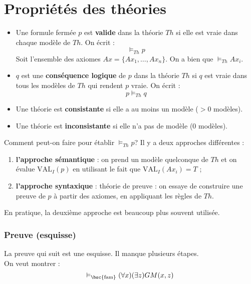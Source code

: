 \section{Propriétés des théories}
\begin{itemize}
\item Une formule fermée $p$ est \textbf{valide} dans la théorie $Th$ si elle est vraie dans chaque modèle de $Th$. On écrit : 
$$\vDash_{Th} p$$
Soit l'ensemble des axiomes $Ax=\{Ax_1, \hdots, Ax_n\}$. On a bien que $\vDash_{Th} Ax_i$.\\
\item $q$ est une \textbf{conséquence logique} de $p$ dans la théorie $Th$ si $q$ est vraie dans tous les modèles de $Th$ qui rendent $p$ vraie. On écrit :  
$$p \vDash_{Th} q$$
\item Une théorie est \textbf{consistante} si elle a au moins un modèle ($>0$ modèles).
\item Une théorie est \textbf{inconsistante} si elle n'a pas de modèle ($0$ modèles).\\
\end{itemize}

Comment peut-on faire pour établir $\vDash_{Th} p$? Il y a deux approches différentes :
\begin{enumerate}
\item \textbf{l'approche sémantique} : on prend un modèle quelconque de $Th$ et on évalue $\text{VAL}_I (p)$ en utilisant le fait que $\text{VAL}_I (Ax_i)=T$ ;
\item \textbf{l'approche syntaxique} : théorie de preuve : on essaye de construire une preuve de $p$ à partir des axiomes, en appliquant les règles de $Th$.\\
\end{enumerate}
En pratique, la deuxième approche est beaucoup plus souvent utilisée.\\


\subsubsection{Preuve (esquisse)}
La preuve qui suit est une esquisse. Il manque plusieurs étapes.\\
On veut montrer  : 
$$\vDash_{\text{\bsc{fam}}} (\forall x)(\exists z) GM(x,z)$$

